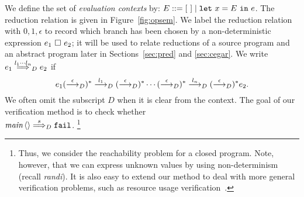 We define the set of \emph{evaluation contexts} by: \(E ::= [\ ] \mid 
\mathtt{let~}x=E\mathtt{~in~}{e}\). The reduction relation is given in 
Figure~\ref{fig:opsem}. We label the reduction relation with 
\(0,1,\epsilon\) to record which branch has been chosen by a 
non-deterministic expression \(e_1\ \square\ e_2\); it will be used to 
relate reductions of a source program and an abstract program later in 
Sections~\ref{sec:pred} and \ref{sec:cegar}. We write \(e_1 
\stackrel{l_1\cdots l_n}{\Longrightarrow}_{D} e_2\) if 
\[e_1 (\stackrel{\epsilon}{\longrightarrow}_{D})^* \stackrel{l_1}{\longrightarrow}_{D}(\stackrel{\epsilon}{\longrightarrow}_{D})^* \cdots (\stackrel{\epsilon}{\longrightarrow}_{D})^* \stackrel{l_n}{\longrightarrow}_{D}(\stackrel{\epsilon}{\longrightarrow}_{D})^* e_2.\]
We often omit the subscript \(D\) when it is clear from the context.
The goal of our verification method is to check whether \\
\(\textit{main}\,\langle{}\rangle \stackrel{s}{\Longrightarrow}_{D} \mathtt{fail}\).%
\footnote{Thus, we consider the reachability problem for a closed 
program. Note, however, that we can express unknown values by using 
non-determinism (recall \textit{randi}). It is also easy to extend our 
method to deal with more general verification problems, such as resource 
usage verification~\cite{Kobayashi2009}.}


